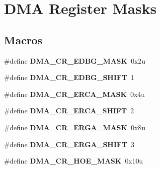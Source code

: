 \hypertarget{group___d_m_a___register___masks}{}\section{D\+M\+A Register Masks}
\label{group___d_m_a___register___masks}
\subsection*{Macros}
\begin{DoxyCompactItemize}
\item 
\hypertarget{group___d_m_a___register___masks_gaa2605f7da2bd6fae13e3e38830bafb1d}{}\#define {\bfseries D\+M\+A\+\_\+\+C\+R\+\_\+\+E\+D\+B\+G\+\_\+\+M\+A\+S\+K}~0x2u\label{group___d_m_a___register___masks_gaa2605f7da2bd6fae13e3e38830bafb1d}

\item 
\hypertarget{group___d_m_a___register___masks_ga8a25fbfa3435be2df140701c300f6cc5}{}\#define {\bfseries D\+M\+A\+\_\+\+C\+R\+\_\+\+E\+D\+B\+G\+\_\+\+S\+H\+I\+F\+T}~1\label{group___d_m_a___register___masks_ga8a25fbfa3435be2df140701c300f6cc5}

\item 
\hypertarget{group___d_m_a___register___masks_ga52ad0bfd27aa8dbb1e157eb2c8099c53}{}\#define {\bfseries D\+M\+A\+\_\+\+C\+R\+\_\+\+E\+R\+C\+A\+\_\+\+M\+A\+S\+K}~0x4u\label{group___d_m_a___register___masks_ga52ad0bfd27aa8dbb1e157eb2c8099c53}

\item 
\hypertarget{group___d_m_a___register___masks_gab3e613091d693c1c110bfbb902d58392}{}\#define {\bfseries D\+M\+A\+\_\+\+C\+R\+\_\+\+E\+R\+C\+A\+\_\+\+S\+H\+I\+F\+T}~2\label{group___d_m_a___register___masks_gab3e613091d693c1c110bfbb902d58392}

\item 
\hypertarget{group___d_m_a___register___masks_ga8e5ada10b82aaab3df6a4763c96e9ffb}{}\#define {\bfseries D\+M\+A\+\_\+\+C\+R\+\_\+\+E\+R\+G\+A\+\_\+\+M\+A\+S\+K}~0x8u\label{group___d_m_a___register___masks_ga8e5ada10b82aaab3df6a4763c96e9ffb}

\item 
\hypertarget{group___d_m_a___register___masks_ga6a87221df93cd96401e8774597b1fdd5}{}\#define {\bfseries D\+M\+A\+\_\+\+C\+R\+\_\+\+E\+R\+G\+A\+\_\+\+S\+H\+I\+F\+T}~3\label{group___d_m_a___register___masks_ga6a87221df93cd96401e8774597b1fdd5}

\item 
\hypertarget{group___d_m_a___register___masks_ga6324cec54d0032bcc142e28f4e1b5978}{}\#define {\bfseries D\+M\+A\+\_\+\+C\+R\+\_\+\+H\+O\+E\+\_\+\+M\+A\+S\+K}~0x10u\label{group___d_m_a___register___masks_ga6324cec54d0032bcc142e28f4e1b5978}


\end{DoxyCompactItemize}
